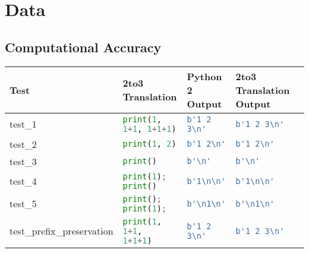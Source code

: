 \section{Data}
\label{appendix:Data}
\subsection{Computational Accuracy}

\begin{table}[]
    \begin{tabular}{@{}l|llll@{}}
    \toprule
    Test                                  & 2to3 Translation                      & Python 2 Output                               & 2to3 Translation Output                       \\ \hline
    test\_1                               & \lstinline[language=Python, style=pythonstyle]|print(1, 1+1, 1+1+1)                 | & \lstinline[language=Python, style=pythonstyle]|b'1 2 3\n'             | & \lstinline[language=Python, style=pythonstyle]|b'1 2 3\n'             | \\ 
    test\_2                               & \lstinline[language=Python, style=pythonstyle]|print(1, 2)                          | & \lstinline[language=Python, style=pythonstyle]|b'1 2\n'               | & \lstinline[language=Python, style=pythonstyle]|b'1 2\n'               | \\ 
    test\_3                               & \lstinline[language=Python, style=pythonstyle]|print()                              | & \lstinline[language=Python, style=pythonstyle]|b'\n'                  | & \lstinline[language=Python, style=pythonstyle]|b'\n'                  | \\ 
    test\_4                               & \lstinline[language=Python, style=pythonstyle]|print(1); print()                    | & \lstinline[language=Python, style=pythonstyle]|b'1\n\n'| & \lstinline[language=Python, style=pythonstyle]|b'1\n\n'| \\ 
    test\_5                               & \lstinline[language=Python, style=pythonstyle]|print(); print(1);                   | & \lstinline[language=Python, style=pythonstyle]|b'\n1\n'| & \lstinline[language=Python, style=pythonstyle]|b'\n1\n'| \\ 
    test\_prefix\_preservation            & \lstinline[language=Python, style=pythonstyle]|print(1,   1+1,   1+1+1)             | & \lstinline[language=Python, style=pythonstyle]|b'1 2 3\n'             | & \lstinline[language=Python, style=pythonstyle]|b'1 2 3\n'             | \\ 

\end{tabular}
\end{table}
